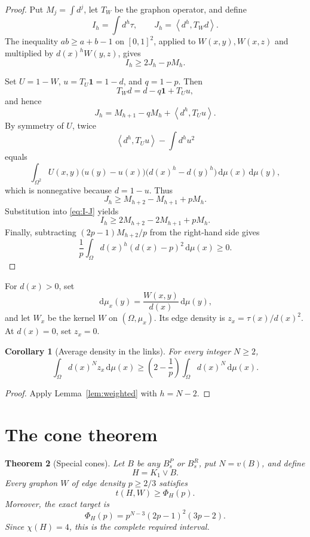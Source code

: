 \documentclass[11pt]{article}
\newtheorem{theorem}{Theorem}[section]
\newtheorem{corollary}[theorem]{Corollary}
\newcommand{\dd}{\,\mathrm{d}}
\newcommand{\one}{\mathbf{1}}
\newcommand{\ip}[2]{\left\langle #1,#2\right\rangle}
\newcommand{\join}{\mathbin{\vee}}
\begin{document}
\begin{proof}
Put $M_j=\int d^j$, let $T_W$ be the graphon operator, and define
\[
I_h=\int d^h\tau,
\qquad
J_h=\ip{d^h}{T_Wd}.
\]
The inequality $ab\geq a+b-1$ on $[0,1]^2$, applied to
$W(x,y),W(x,z)$ and multiplied by $d(x)^hW(y,z)$, gives
\begin{equation}
I_h\geq2J_h-pM_h.
\label{eq:I-J}
\end{equation}

Set $U=1-W$, $u=T_U\one=1-d$, and $q=1-p$.  Then
\[
T_Wd=d-q\one+T_Uu,
\]
and hence
\begin{equation}
J_h=M_{h+1}-qM_h+\ip{d^h}{T_Uu}.
\label{eq:J}
\end{equation}
By symmetry of $U$, twice
\[
\ip{d^h}{T_Uu}-\int d^hu^2
\]
equals
\[
\int_{\Omega^2}U(x,y)
\bigl(u(y)-u(x)\bigr)
\bigl(d(x)^h-d(y)^h\bigr)
\dd\mu(x)\dd\mu(y),
\]
which is nonnegative because $d=1-u$.  Thus
\[
J_h\geq M_{h+2}-M_{h+1}+pM_h.
\]
Substitution into \eqref{eq:I-J} yields
\[
I_h\geq2M_{h+2}-2M_{h+1}+pM_h.
\]
Finally, subtracting $(2p-1)M_{h+2}/p$ from the right-hand side gives
\[
\frac1p\int_\Omega d(x)^h(d(x)-p)^2\dd\mu(x)\geq0.
\]
\end{proof}

For $d(x)>0$, set
\[
\dd\mu_x(y)=\frac{W(x,y)}{d(x)}\dd\mu(y),
\]
and let $W_x$ be the kernel $W$ on $(\Omega,\mu_x)$.  Its edge density
is $z_x=\tau(x)/d(x)^2$.  At $d(x)=0$, set $z_x=0$.

\begin{corollary}[Average density in the links]
\label{cor:average}
For every integer $N\geq2$,
\[
\int_\Omega d(x)^Nz_x\dd\mu(x)
\geq
\left(2-\frac1p\right)\int_\Omega d(x)^N\dd\mu(x).
\]
\end{corollary}

\begin{proof}
Apply Lemma~\ref{lem:weighted} with $h=N-2$.
\end{proof}


\section{The cone theorem}

\begin{theorem}[Special cones]
\label{thm:main}
Let $B$ be any $B_s^P$ or $B_s^R$, put $N=v(B)$, and define
\[
H=K_1\join B.
\]
Every graphon $W$ of edge density $p\geq2/3$ satisfies
\[
\boxed{t(H,W)\geq\Phi_H(p).}
\]
Moreover, the exact target is
\begin{equation}
\Phi_H(p)
=p^{N-3}(2p-1)^2(3p-2).
\label{eq:cone-target}
\end{equation}
Since $\chi(H)=4$, this is the complete required interval.
\end{theorem}
\end{document}
